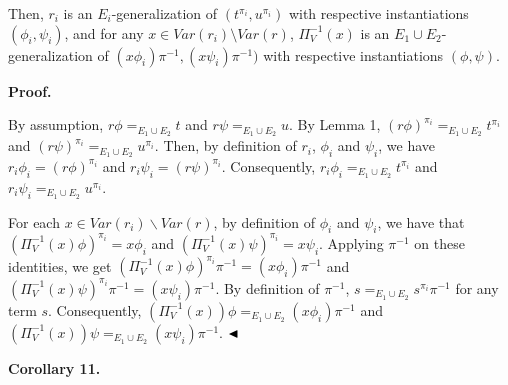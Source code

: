 \documentclass[10pt,a4paper]{amsart}
\begin{document}
 
  
 
  
Then, $r_{i}$ is an $E_{i}$-generalization of $(t^{\pi_{i}},u^{\pi_{i}})$ with respective instantiations $(\phi_{i},\psi_{i})$, and for any $x\in\mathit{Var}(r_{i})\setminus\mathit{Var}(r)$, $\Pi_{V}^{-1}(x)$ is an $E_{1}\cup E_{2}$-generalization of $(x\phi_{i})\pi^{-1},(x\psi_{i})\pi^{-1})$ with respective instantiations $(\phi,\psi)$.\par
 
 
 
 

 
\par\medskip\noindent\textbf{Proof.}\par
 
 
By assumption, $r\phi=_{E_{1}\cup E_{2}}t$ and $r\psi=_{E_{1}\cup E_{2}}u$. By Lemma 1, $(r\phi)^{\pi_{i}}=_{E_{1}\cup E_{2}}t^{\pi_{i}}$ and $(r\psi)^{\pi_{i}}=_{E_{1}\cup E_{2}}u^{\pi_{i}}$. Then, by definition of $r_{i}$, $\phi_{i}$ and $\psi_{i}$, we have $r_{i}\phi_{i}=(r\phi)^{\pi_{i}}$ and $r_{i}\psi_{i}=(r\psi)^{\pi_{i}}$. Consequently, $r_{i}\phi_{i}=_{E_{1}\cup E_{2}}t^{\pi_{i}}$ and $r_{i}\psi_{i}=_{E_{1}\cup E_{2}}u^{\pi_{i}}$.\par
 
 
 
For each $x\in\mathit{Var}(r_{i})\backslash\mathit{Var}(r)$, by definition of $\phi_{i}$ and $\psi_{i}$, we have that $(\Pi_{V}^{-1}(x)\phi)^{\pi_{i}}=x\phi_{i}$ and $(\Pi_{V}^{-1}(x)\psi)^{\pi_{i}}=x\psi_{i}$. Applying $\pi^{-1}$ on these identities, we get $(\Pi_{V}^{-1}(x)\phi)^{\pi_{i}}\pi^{-1}=(x\phi_{i})\pi^{-1}$ and $(\Pi_{V}^{-1}(x)\psi)^{\pi_{i}}\pi^{-1}=(x\psi_{i})\pi^{-1}$. By definition of $\pi^{-1}$, $s=_{E_{1}\cup E_{2}}s^{\pi_{i}}\pi^{-1}$ for any term $s$. Consequently, $(\Pi_{V}^{-1}(x))\phi=_{E_{1}\cup E_{2}}(x\phi_{i})\pi^{-1}$ and $(\Pi_{V}^{-1}(x))\psi=_{E_{1}\cup E_{2}}(x\psi_{i})\pi^{-1}$. $\hfill\blacktriangleleft$\par
 

 
\par\medskip\noindent\textbf{Corollary 11.}\par
 
\end{document}
